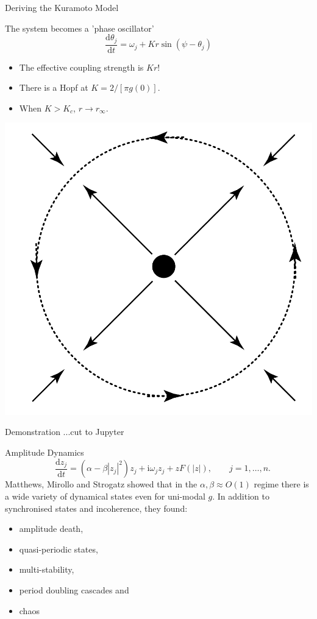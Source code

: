 \documentclass[10pt,reqno]{beamer}
\newcommand{\D}[2]{\frac{\mathrm{d} #1}{\mathrm{d} #2}}
\newcommand{\I}{\mathrm{i}}
\begin{document}
\begin{frame}{Deriving the Kuramoto Model}
{\begin{minipage}{0.7\linewidth}
The system becomes a 'phase oscillator'
\[
\D{\theta_j}{t} = \omega_j + Kr\sin(\psi - \theta_j)
\]
\begin{itemize}
	\item The effective coupling strength is $Kr$!
	\item There is a Hopf at $K = 2/[\pi g(0)]$.
	\item When $K>K_c$, $r \rightarrow r_\infty$.
\end{itemize}
\end{minipage}\hfill
\begin{minipage}{0.3\linewidth}
	\includegraphics[height=0.3\textheight]{hopffast}
\end{minipage}


}
\end{frame}
\begin{frame}{Demonstration}
\centering
\vfill
...cut to Jupyter
\end{frame}
\begin{frame}{Amplitude Dynamics}
\[
\quad \D{z_j}{t} = (\alpha - \beta|z_j|^2)z_j + \I\omega_jz_j +zF(|z|), \qquad j = 1,\ldots, n.
\]
Matthews, Mirollo and Strogatz\cite{Matthews91} showed that in the $\alpha, \beta \approx O(1)$ regime there is a wide variety of dynamical states even for uni-modal $g$.
In addition to synchronised states and incoherence, they found:
\begin{itemize}
	\item amplitude death,
	\item quasi-periodic states,
	\item multi-stability,
	\item period doubling cascades and
	\item chaos
\end{itemize}
\end{frame}
\end{document}
